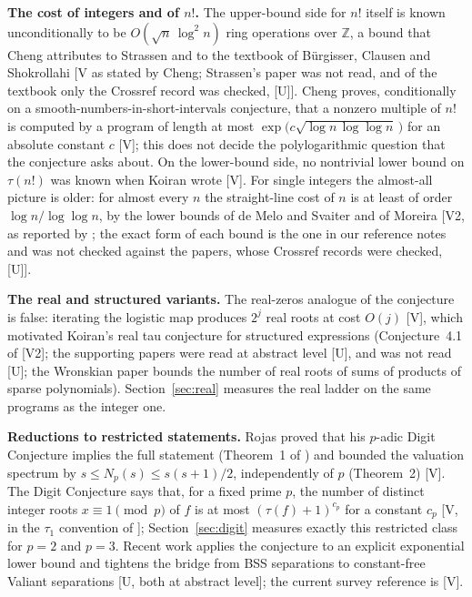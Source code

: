 \documentclass[11pt]{article}
\theoremstyle{definition}
\theoremstyle{remark}
\newcommand{\Z}{\mathbb{Z}}
\begin{document}
\textbf{The cost of integers and of $n!$.} The upper-bound side for $n!$ itself is known
unconditionally to be
$O(\sqrt{n}\,\log^2 n)$ ring operations over $\Z$, a bound that Cheng attributes to Strassen
and to the textbook of B\"urgisser, Clausen and Shokrollahi \cite{BCS1997}
\cite[\S1]{Cheng2004} [V as stated by Cheng; Strassen's paper was not read, and of the textbook
only the Crossref record was checked, [U]]. Cheng proves, conditionally on a
smooth-numbers-in-short-intervals conjecture, that a nonzero multiple of $n!$ is computed by a
program of length at most $\exp\bigl(c\sqrt{\log n\,\log\log n}\,\bigr)$ for an absolute
constant $c$ \cite[Thm.~1]{Cheng2004} [V]; this does not decide the polylogarithmic
question that the conjecture asks about. On the lower-bound side, no nontrivial lower
bound on $\tau(n!)$ was known when Koiran wrote \cite{Koiran2004} [V]. For single integers the
almost-all picture is older: for almost every $n$ the straight-line cost of $n$ is at least of
order $\log n/\log\log n$, by the lower bounds of de Melo and Svaiter \cite{deMeloSvaiter1996} and
of Moreira \cite{Moreira1997} [V2, as reported by \cite{Koiran2004}; the exact form of each bound
is the one in our reference notes and was not checked against the papers, whose Crossref records
were checked, [U]].

\textbf{The real and structured variants.} The real-zeros analogue of the conjecture is false:
iterating the logistic map produces $2^j$ real roots at cost $O(j)$ \cite[Example~1]{Rojas2003}
[V], which motivated Koiran's real tau conjecture for structured expressions (Conjecture~4.1
of \cite{Burgisser2024} [V2]; the supporting papers
\cite{Koiran2011, KPTT2015, KPT2015, Hrubes2013, BriquelBurgisser2020} were read at abstract level
[U], and \cite{Dutta2021} was not read [U]; the Wronskian paper \cite{KPT2015} bounds the number
of real roots of sums of products of sparse polynomials). Section~\ref{sec:real} measures the
real ladder on the same programs as the integer one.

\textbf{Reductions to restricted statements.} Rojas proved that his $p$-adic Digit Conjecture
implies the full statement (Theorem~1 of \cite{Rojas2003}) and bounded the valuation spectrum by
$s \le N_p(s) \le s(s+1)/2$, independently of $p$ (Theorem~2) [V]. The Digit Conjecture says
that, for a fixed prime $p$, the number of distinct integer roots $x \equiv 1 \pmod p$ of $f$ is at
most $(\tau(f)+1)^{c_p}$ for a constant $c_p$ [V, in the $\tau_1$ convention of
\cite{Rojas2003}]; Section~\ref{sec:digit} measures exactly this restricted class for $p = 2$ and
$p = 3$. Recent work applies the conjecture to an explicit exponential lower bound
\cite{BBDM2026} and tightens the bridge from BSS separations to constant-free Valiant
separations \cite{Burgisser2026} [U, both at abstract level]; the current survey reference is
\cite[\S4.6]{Burgisser2024} [V].
\end{document}
